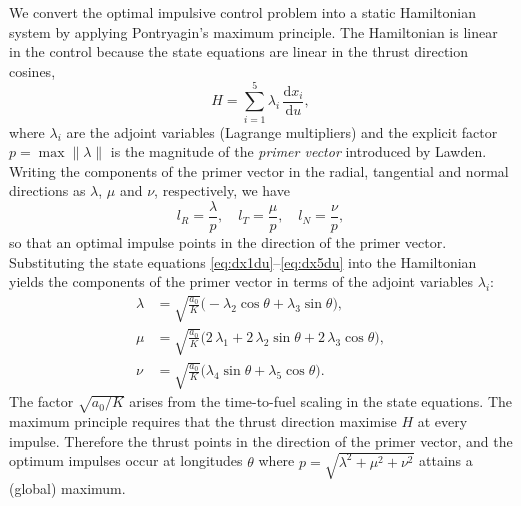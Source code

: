 \documentclass[12pt]{article}
\begin{document}
We convert the optimal impulsive control problem into a static
Hamiltonian system by applying Pontryagin's maximum principle.  The
Hamiltonian is linear in the control because the state equations are
linear in the thrust direction cosines,
\begin{equation}
  H = \sum_{i=1}^5 \lambda_i\,\frac{\mathrm{d}x_i}{\mathrm{d}u},
  \tag{6}\label{eq:Hamiltonian}
\end{equation}
where $\lambda_i$ are the adjoint variables (Lagrange multipliers) and
the explicit factor $p = \max\|\lambda\|$ is the magnitude of the
\emph{primer vector} introduced by Lawden.  Writing the components of
the primer vector in the radial, tangential and normal directions as
$\lambda$, $\mu$ and $\nu$, respectively, we have
\begin{equation}
  l_R = \frac{\lambda}{p},\quad l_T = \frac{\mu}{p},\quad
  l_N = \frac{\nu}{p},
  \tag{7}\label{eq:thrustdircos}
\end{equation}
so that an optimal impulse points in the direction of the primer
vector.  Substituting the state equations
\eqref{eq:dx1du}--\eqref{eq:dx5du} into the Hamiltonian yields the
components of the primer vector in terms of the adjoint variables
$\lambda_i$:
\begin{align}
  \lambda &= \sqrt{\frac{a_0}{K}}
    \bigl(-\lambda_2\cos\theta + \lambda_3\sin\theta\bigr),
    \tag{8}\label{eq:lambda}\\
  \mu &= \sqrt{\frac{a_0}{K}}
    \bigl(2\,\lambda_1 + 2\,\lambda_2\sin\theta + 2\,\lambda_3\cos\theta\bigr),
    \tag{9}\label{eq:mu}\\
  \nu &= \sqrt{\frac{a_0}{K}}
    \bigl(\lambda_4\sin\theta + \lambda_5\cos\theta\bigr).
    \tag{10}\label{eq:nu}
\end{align}
The factor $\sqrt{a_0/K}$ arises from the time-to-fuel scaling in the
state equations.  The maximum principle requires that the thrust
direction maximise $H$ at every impulse.  Therefore the thrust points
in the direction of the primer vector, and the optimum impulses occur
at longitudes $\theta$ where $p = \sqrt{\lambda^2 + \mu^2 + \nu^2}$
attains a (global) maximum.
\end{document}
